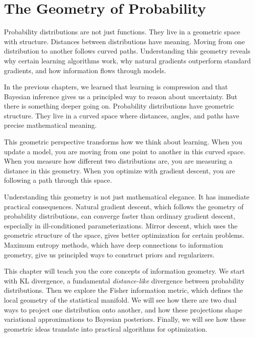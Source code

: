 
\chapter{The Geometry of Probability}

\begin{keyinsight}
Probability distributions are not just functions. They live in a geometric space with structure. Distances between distributions have meaning. Moving from one distribution to another follows curved paths. Understanding this geometry reveals why certain learning algorithms work, why natural gradients outperform standard gradients, and how information flows through models.
\end{keyinsight}

\vspace{1.5em}

In the previous chapters, we learned that learning is compression and that Bayesian inference gives us a principled way to reason about uncertainty. But there is something deeper going on. Probability distributions have geometric structure. They live in a curved space where distances, angles, and paths have precise mathematical meaning.

This geometric perspective transforms how we think about learning. When you update a model, you are moving from one point to another in this curved space. When you measure how different two distributions are, you are measuring a distance in this geometry. When you optimize with gradient descent, you are following a path through this space.

Understanding this geometry is not just mathematical elegance. It has immediate practical consequences. Natural gradient descent, which follows the geometry of probability distributions, can converge faster than ordinary gradient descent, especially in ill-conditioned parameterizations. Mirror descent, which uses the geometric structure of the space, gives better optimization for certain problems. Maximum entropy methods, which have deep connections to information geometry, give us principled ways to construct priors and regularizers.

This chapter will teach you the core concepts of information geometry. We start with KL divergence, a fundamental \emph{distance-like} divergence between probability distributions. Then we explore the Fisher information metric, which defines the local geometry of the statistical manifold. We will see how there are two dual ways to project one distribution onto another, and how these projections shape variational approximations to Bayesian posteriors. Finally, we will see how these geometric ideas translate into practical algorithms for optimization.

